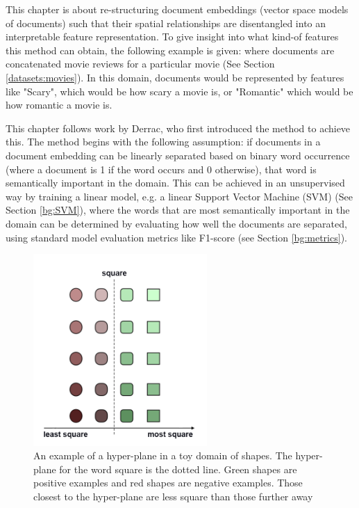 

This chapter is about re-structuring document embeddings (vector space models of documents) such that  their  spatial relationships are disentangled into an interpretable feature representation. To give insight into what kind-of features this method can obtain, the following example is given:  where documents are concatenated movie reviews for a particular movie (See Section \ref{datasets:movies}). In this domain, documents would be represented by features like "Scary", which would be how scary a movie is, or "Romantic" which would be how romantic a movie is.

This chapter follows work by Derrac\cite{Derrac2015}, who first introduced the method to achieve this. The method begins with the following assumption: if documents in a document embedding  can be linearly separated based on binary word occurrence (where a document is 1 if the word occurs and 0 otherwise), that word is semantically important in the domain. This can be achieved in an unsupervised way by training a linear model, e.g. a linear Support Vector Machine (SVM) (See Section \ref{bg:SVM}), where the words that are most semantically important in the domain can be determined by evaluating how well the documents are separated, using standard model evaluation metrics like F1-score (see Section \ref{bg:metrics}).

\begin{figure}[t]
	\includegraphics[width=250px]{images/Toyhyperplane1Direction.png}
	\centering
	\caption{An example of a hyper-plane in a toy domain of shapes. The hyper-plane for the word square is the dotted line. Green shapes are positive examples and red shapes are negative examples. Those closest to the hyper-plane are less square than those further away}\label{ch3:HyperPlaneNoDir}
\end{figure}

